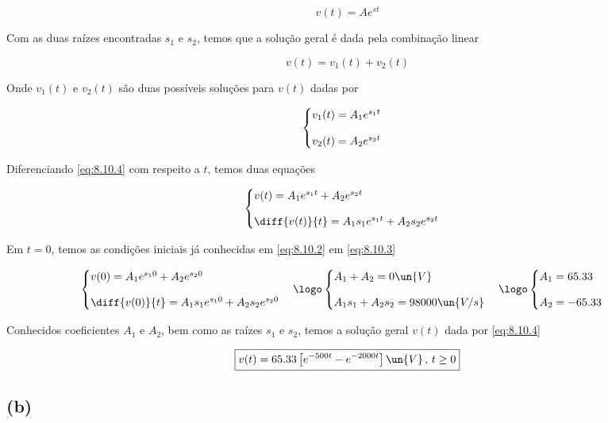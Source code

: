 \[ v(t) = Ae^{st}  \]

Com as duas raízes encontradas $s_1$ e $s_2$, temos que a solução geral é dada pela combinação linear

\begin{equation}\label{eq:8.10.4}
    v(t) = v_1(t) + v_2(t)
\end{equation}

Onde $v_1(t)$ e $v_2(t)$ são duas possíveis soluções para $v(t)$ dadas por  

\[ \begin{cases}
        v_1(t) = A_1e^{s_1t}  & \\
        \noalign{\vskip9pt}
        v_2(t) = A_2e^{s_2t}
    \end{cases}
\]

Diferenciando \eqref{eq:8.10.4} com respeito a $t$, temos duas equações

\[ \begin{cases}
        v(t) = A_1e^{s_1t} + A_2e^{s_2t} & \\
        \noalign{\vskip9pt}
        \diff{v(t)}{t} = A_1s_1e^{s_1t} + A_2s_2e^{s_2t}
    \end{cases}
\]

Em $t=0$, temos as condições iniciais já conhecidas em \eqref{eq:8.10.2} em \eqref{eq:8.10.3}

\[ \begin{cases}
        v(0) = A_1e^{s_10} + A_2e^{s_20} & \\
        \noalign{\vskip9pt}
        \diff{v(0)}{t} = A_1s_1e^{s_10} + A_2s_2e^{s_20}
    \end{cases}
    \logo
    \begin{cases}
        A_1 + A_2 = 0 \un{V} & \\
        \noalign{\vskip9pt}
        A_1s_1 + A_2s_2 = 98000 \un{V/s}
    \end{cases}
    \logo
    \begin{cases}
        A_1 =  65.33 & \\
        \noalign{\vskip9pt}
        A_2 = -65.33
    \end{cases}
\]

Conhecidos coeficientes $A_1$ e $A_2$, bem como as raízes $s_1$ e $s_2$, temos a solução geral $v(t)$ dada por  \eqref{eq:8.10.4}

\[ \boxed{v(t) = 65.33\left[e^{-500t} - e^{-2000t}\right] \un{V} \, , \, t \geq 0 }  \]

\subsection*{(b)}

